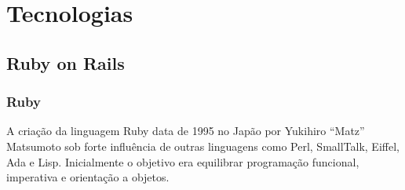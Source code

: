 \chapter{Tecnologias}
\label{cap:tecnologias}
\section{Ruby on Rails}
\subsection{Ruby}
    \par A criação da linguagem Ruby data de 1995 no Japão por Yukihiro ``Matz'' Matsumoto sob forte influência de outras linguagens como Perl, SmallTalk, Eiffel, Ada e Lisp.  Inicialmente o objetivo era equilibrar programação funcional, imperativa e orientação a objetos. \citep{rubydocs}
